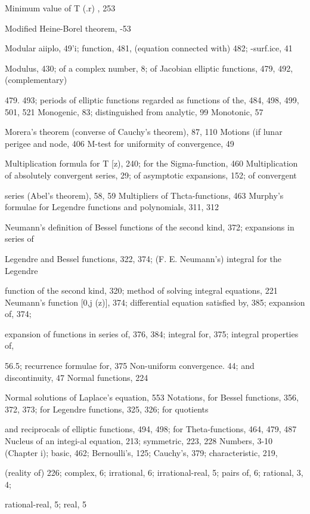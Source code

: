 Minimum value of T (.r) , 253

%
%

Modified Heine-Borel theorem, -53

Modular aiiplo, 49'i; function, 481, (equation connected with) 482; -surf.ice, 41

Modulus, 430; of a complex number, 8; of Jacobian elliptic functions, 479, 492, (complementary)

479. 493; periods of elliptic functions regarded as functions of the, 484, 498, 499, 501, 521
Monogenic, 83; distinguished from analytic, 99
Monotonic, 57

Morera's theorem (converse of Cauchy's theorem), 87, 110
Motions (if lunar perigee and node, 406
M-test for uniformity of convergence, 49

Multiplication formula for T [z), 240; for the Sigma-function, 460
Multiplication of absolutely convergent series, 29; of asymptotic expansions, 152; of convergent

series (Abel's theorem), 58, 59
Multipliers of Thcta-functions, 463
Murphy's formulae for Legendre functions and polynomials, 311, 312

Neumann's definition of Bessel functions of the second kind, 372; expansions in series of

Legendre and Bessel functions, 322, 374; (F. E. Neumann's) integral for the Legendre

function of the second kind, 320; method of solving integral equations, 221
Neumann's function [0,j (z)], 374; differential equation satisfied by, 385; expansion of, 374;

expansion of functions in series of, 376, 384; integral for, 375; integral properties of,

56.5; recurrence formulae for, 375
Non-uniform convergence. 44; and discontinuity, 47
Normal functions, 224

Normal solutions of Laplace's equation, 553
Notations, for Bessel functions, 356, 372, 373; for Legendre functions, 325, 326; for quotients

and reciprocals of elliptic functions, 494, 498; for Theta-functions, 464, 479, 487
Nucleus of an integi-al equation, 213; symmetric, 223, 228
Numbers, 3-10 (Chapter i); basic, 462; Bernoulli's, 125; Cauchy's, 379; characteristic, 219,

(reality of) 226; complex, 6; irrational, 6; irrational-real, 5; pairs of, 6; rational, 3, 4;

rational-real, 5; real, 5

